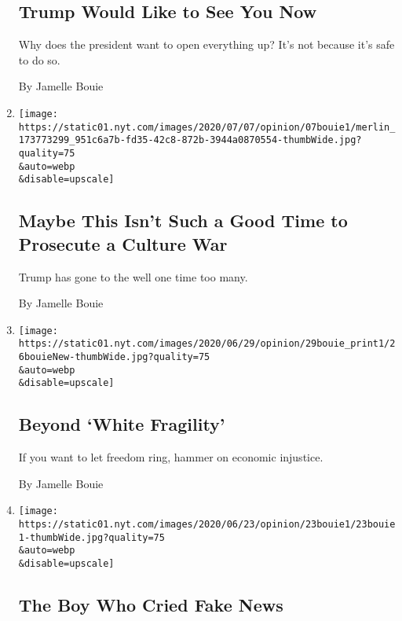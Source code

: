 \begin{enumerate}
  \hypertarget{trump-would-like-to-see-you-now}{%
  \subsection{Trump Would Like to See You
  Now}\label{trump-would-like-to-see-you-now}}

  Why does the president want to open everything up? It's not because
  it's safe to do so.

  By Jamelle Bouie
\item
  \href{/2020/07/07/opinion/trump-mount-rushmore-culture-war.html}{}

  \texttt{[image: https://static01.nyt.com/images/2020/07/07/opinion/07bouie1/merlin\_173773299\_951c6a7b-fd35-42c8-872b-3944a0870554-thumbWide.jpg?quality=75\\\&auto=webp\\\&disable=upscale]}

  \hypertarget{maybe-this-isnt-such-a-good-time-to-prosecute-a-culture-war}{%
  \subsection{Maybe This Isn't Such a Good Time to Prosecute a Culture
  War}\label{maybe-this-isnt-such-a-good-time-to-prosecute-a-culture-war}}

  Trump has gone to the well one time too many.

  By Jamelle Bouie
\item
  \href{/2020/06/26/opinion/black-lives-matter-injustice.html}{}

  \texttt{[image: https://static01.nyt.com/images/2020/06/29/opinion/29bouie\_print1/26bouieNew-thumbWide.jpg?quality=75\\\&auto=webp\\\&disable=upscale]}

  \hypertarget{beyond-white-fragility}{%
  \subsection{Beyond `White Fragility'}\label{beyond-white-fragility}}

  If you want to let freedom ring, hammer on economic injustice.

  By Jamelle Bouie
\item
  \href{/2020/06/23/opinion/maga-trump-fake-news.html}{}

  \texttt{[image: https://static01.nyt.com/images/2020/06/23/opinion/23bouie1/23bouie1-thumbWide.jpg?quality=75\\\&auto=webp\\\&disable=upscale]}

  \hypertarget{the-boy-who-cried-fake-news}{%
  \subsection{The Boy Who Cried Fake
  News}\label{the-boy-who-cried-fake-news}}


\end{enumerate}
